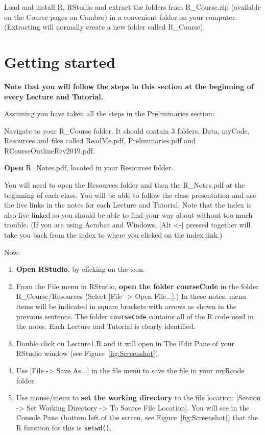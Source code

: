 \documentclass[titlepage]{book}\usepackage{knitr}
\begin{document}
Load and install R, RStudio and extract the folders from R\_Course.zip (available on the Course pages on Cambro) in a convenient folder on your computer. (Extracting will normally create a new folder called R\_Course).

\section{Getting started}

\textbf{Note that you will follow the steps in this section at the beginning of every Lecture and Tutorial.}

Assuming you have taken all the steps in the Preliminaries section:

Navigate to your R\_Course folder. It should contain 3 folders, Data, myCode, Resources and files called ReadMe.pdf, Preliminaries.pdf and RCourseOutlineRev2019.pdf. 

\textbf{Open} R\_Notes.pdf, located in your Resources folder.

You will need to open the Resources folder and then the R\_Notes.pdf at the beginning of each class. You will be able to follow the class presentation and use the live links in the notes for each Lecture and Tutorial. Note that the index is also live-linked so you should be able to find your way about without too much trouble. (If you are using Acrobat and Windows, [Alt <-] pressed together will take you back from the index to where you clicked on the index link.)

Now: 

\begin{enumerate}

\item {\textbf{Open RStudio}, by clicking on the icon.}

\item{From the File menu in RStudio, \textbf{open the folder courseCode} in the folder R\_Course/Resources  (Select [File -> Open File...].) In these notes, menu items will be indicated in square brackets with arrows as shown in the previous sentence.  The folder \texttt{courseCode} contains all of the R code used in the notes.  Each Lecture and Tutorial is clearly identified.} 

\item{Double click on Lecture1.R and it will open in The Edit Pane  of your RStudio window (see Figure~\ref{fig:Screenshot}).}

\item{Use [File -> Save As...] in the file menu to save the file in your myRcode folder.}  

\item{Use mouse/menu to \textbf{set the working directory} to the file location: [Session -> Set Working Directory -> To Source File Location]. You will see in the Console Pane (bottom left of the screen, see Figure~\ref{fig:Screenshot}) that the R function for this is \texttt{setwd()}.}

\end{enumerate}
\end{document}
